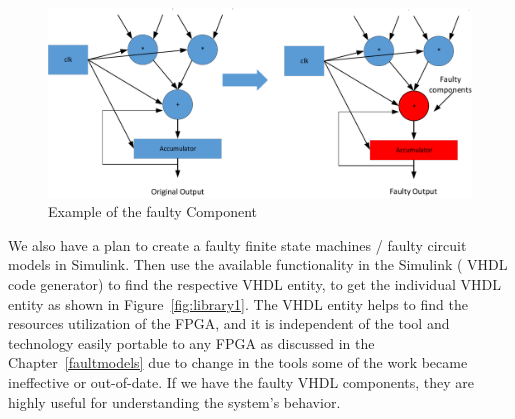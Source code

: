 \begin{figure}[tb!]

 \centering
  \captionsetup{justification=centering}    
   \includegraphics[scale=0.8]{Figures/MAC.pdf}
   \caption{Example of the faulty Component}
\label{fig:lib1}
\end{figure}


We also have a plan to create a faulty finite state machines / faulty circuit models in Simulink. Then use the available functionality in the Simulink ( VHDL code generator) to find the respective VHDL entity, to get the individual VHDL entity as shown in Figure~\ref{fig:library1}. The VHDL entity helps to find the resources utilization of the FPGA, and it is independent of the tool and technology easily portable to any FPGA as discussed in the Chapter~\ref{faultmodels} due to change in the tools some of the work became ineffective or out-of-date. If we have the faulty VHDL components, they are highly useful for understanding the system's behavior.
%
%

